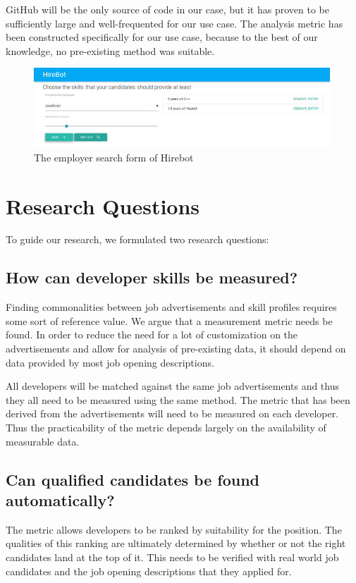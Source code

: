 GitHub will be the only source of code in our case, but it has proven to be sufficiently large and well-frequented for our use case. The analysis metric has been constructed specifically for our use case, because to the best of our knowledge, no pre-existing method was suitable.

\begin{figure}
  \includegraphics[width=30em]{gfx/employerview.png}
  \caption{The employer search form of Hirebot}
  \label{fig:employerview}
\end{figure}

\section{Research Questions}\label{sec:research-questions}
To guide our research, we formulated two research questions:

\subsection{How can developer skills be measured?}\label{subsec:dev-skill-measurement}
Finding commonalities between job advertisements and skill profiles
requires some sort of reference value. We argue that a measurement
metric needs be found.
In order to reduce the need for a lot of customization
on the advertisements and allow for  analysis of pre-existing data,
it should depend on data provided by most job opening descriptions.
\newline

All developers will be matched against the same job advertisements
and thus they all need to be measured using the same method.
The metric that has been derived from the advertisements will need to be
measured on each developer. Thus the practicability of the metric depends largely on
the availability of measurable data.

\subsection{Can qualified candidates be found automatically?}\label{subsec:measurement-quality}
The metric allows developers to be ranked by suitability for the position. The qualities of this ranking are ultimately determined by whether or not the right candidates land at the top of it. This needs to be verified with real world job candidates and the job opening descriptions that they applied for.

